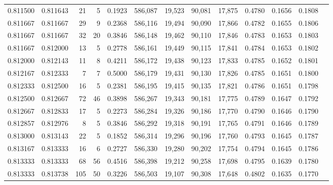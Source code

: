 \begin{tabular}{rrrrrrrrrrrrr}
0.811500 & 0.811643 &    21 &   5 &                                     0.1923 & 586,087 &  19,523 &  90,081 &  17,875 & 0.4780 & 0.1656 & 0.1808 \\
0.811667 & 0.811667 &    29 &   9 &                                     0.2368 & 586,116 &  19,494 &  90,090 &  17,866 & 0.4782 & 0.1655 & 0.1806 \\
0.811667 & 0.811667 &    32 &  20 &                                     0.3846 & 586,148 &  19,462 &  90,110 &  17,846 & 0.4783 & 0.1653 & 0.1803 \\
0.811667 & 0.812000 &    13 &   5 &                                     0.2778 & 586,161 &  19,449 &  90,115 &  17,841 & 0.4784 & 0.1653 & 0.1802 \\
0.812000 & 0.812143 &    11 &   8 &                                     0.4211 & 586,172 &  19,438 &  90,123 &  17,833 & 0.4785 & 0.1652 & 0.1801 \\
0.812167 & 0.812333 &     7 &   7 &                                     0.5000 & 586,179 &  19,431 &  90,130 &  17,826 & 0.4785 & 0.1651 & 0.1800 \\
0.812333 & 0.812500 &    16 &   5 &                                     0.2381 & 586,195 &  19,415 &  90,135 &  17,821 & 0.4786 & 0.1651 & 0.1798 \\
0.812500 & 0.812667 &    72 &  46 &                                     0.3898 & 586,267 &  19,343 &  90,181 &  17,775 & 0.4789 & 0.1647 & 0.1792 \\
0.812667 & 0.812833 &    17 &   5 &                                     0.2273 & 586,284 &  19,326 &  90,186 &  17,770 & 0.4790 & 0.1646 & 0.1790 \\
0.812857 & 0.812976 &     8 &   5 &                                     0.3846 & 586,292 &  19,318 &  90,191 &  17,765 & 0.4791 & 0.1646 & 0.1789 \\
0.813000 & 0.813143 &    22 &   5 &                                     0.1852 & 586,314 &  19,296 &  90,196 &  17,760 & 0.4793 & 0.1645 & 0.1787 \\
0.813167 & 0.813333 &    16 &   6 &                                     0.2727 & 586,330 &  19,280 &  90,202 &  17,754 & 0.4794 & 0.1645 & 0.1786 \\
0.813333 & 0.813333 &    68 &  56 &                                     0.4516 & 586,398 &  19,212 &  90,258 &  17,698 & 0.4795 & 0.1639 & 0.1780 \\
0.813333 & 0.813738 &   105 &  50 &                                     0.3226 & 586,503 &  19,107 &  90,308 &  17,648 & 0.4802 & 0.1635 & 0.1770 \\

\end{tabular}
